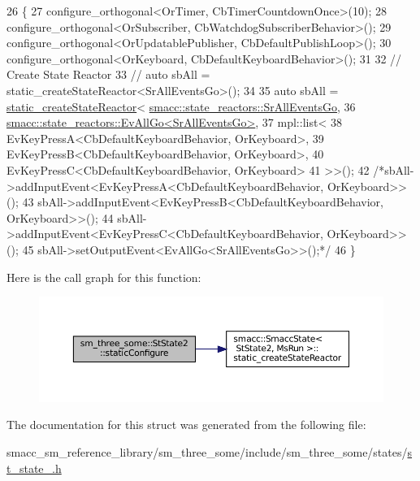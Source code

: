 \begin{DoxyCode}
26     \{
27         configure\_orthogonal<OrTimer, CbTimerCountdownOnce>(10);
28         configure\_orthogonal<OrSubscriber, CbWatchdogSubscriberBehavior>();
29         configure\_orthogonal<OrUpdatablePublisher, CbDefaultPublishLoop>();
30         configure\_orthogonal<OrKeyboard, CbDefaultKeyboardBehavior>();
31 
32         \textcolor{comment}{// Create State Reactor}
33         \textcolor{comment}{// auto sbAll = static\_createStateReactor<SrAllEventsGo>();}
34         
35         \textcolor{keyword}{auto} sbAll = \hyperlink{classsmacc_1_1SmaccState_a892be704b48f93bf5c35635d1a58ed54}{static\_createStateReactor}<
      \hyperlink{classsmacc_1_1state__reactors_1_1SrAllEventsGo}{smacc::state\_reactors::SrAllEventsGo},
36                                                
      \hyperlink{structsmacc_1_1state__reactors_1_1EvAllGo}{smacc::state\_reactors::EvAllGo<SrAllEventsGo>},
37                                                mpl::list<
38                                                            EvKeyPressA<CbDefaultKeyboardBehavior,
       OrKeyboard>,
39                                                            EvKeyPressB<CbDefaultKeyboardBehavior,
       OrKeyboard>,
40                                                            EvKeyPressC<CbDefaultKeyboardBehavior,
       OrKeyboard>
41                                                            >>();
42         \textcolor{comment}{/*sbAll->addInputEvent<EvKeyPressA<CbDefaultKeyboardBehavior, OrKeyboard>>();}
43 \textcolor{comment}{        sbAll->addInputEvent<EvKeyPressB<CbDefaultKeyboardBehavior, OrKeyboard>>();}
44 \textcolor{comment}{        sbAll->addInputEvent<EvKeyPressC<CbDefaultKeyboardBehavior, OrKeyboard>>();}
45 \textcolor{comment}{        sbAll->setOutputEvent<EvAllGo<SrAllEventsGo>>();*/}
46     \}
\end{DoxyCode}
Here is the call graph for this function\+:
\nopagebreak
\begin{figure}[H]
\begin{center}
\leavevmode
\includegraphics[width=350pt]{structsm__three__some_1_1StState2_af07ae40962e343ce9605288f0ebad82b_cgraph}
\end{center}
\end{figure}


The documentation for this struct was generated from the following file\+:\begin{DoxyCompactItemize}
\item 
smacc\+\_\+sm\+\_\+reference\+\_\+library/sm\+\_\+three\+\_\+some/include/sm\+\_\+three\+\_\+some/states/\hyperlink{sm__three__some_2include_2sm__three__some_2states_2st__state__2_8h}{st\+\_\+state\+\_.\+h}\end{DoxyCompactItemize}
